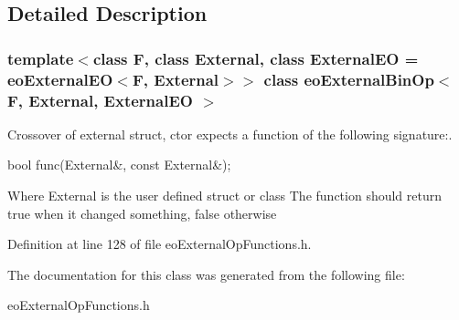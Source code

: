 \subsection{Detailed Description}
\subsubsection*{template$<$class F, class External, class External\-EO = eo\-External\-EO$<$F, External$>$$>$ class eo\-External\-Bin\-Op$<$ F, External, External\-EO $>$}

Crossover of external struct, ctor expects a function of the following signature:. 

bool func(External\&, const External\&);

Where External is the user defined struct or class The function should return true when it changed something, false otherwise 



Definition at line 128 of file eo\-External\-Op\-Functions.h.

The documentation for this class was generated from the following file:\begin{CompactItemize}
\item 
eo\-External\-Op\-Functions.h\end{CompactItemize}
